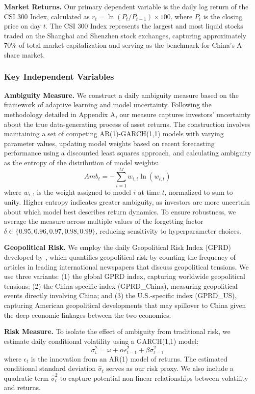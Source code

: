\documentclass[preprint,12pt,authoryear]{elsarticle}
\begin{document}
\textbf{Market Returns.} Our primary dependent variable is the daily log return of the CSI 300 Index, calculated as $r_t = \ln(P_t/P_{t-1}) \times 100$, where $P_t$ is the closing price on day $t$. The CSI 300 Index represents the largest and most liquid stocks traded on the Shanghai and Shenzhen stock exchanges, capturing approximately 70\% of total market capitalization and serving as the benchmark for China's A-share market.

\subsubsection{Key Independent Variables}

\textbf{Ambiguity Measure.} We construct a daily ambiguity measure based on the framework of adaptive learning and model uncertainty. Following the methodology detailed in Appendix A, our measure captures investors' uncertainty about the true data-generating process of asset returns. The construction involves maintaining a set of competing AR(1)-GARCH(1,1) models with varying parameter values, updating model weights based on recent forecasting performance using a discounted least squares approach, and calculating ambiguity as the entropy of the distribution of model weights:
\begin{equation}
Amb_t = -\sum_{i=1}^{M} w_{i,t} \ln(w_{i,t})
\end{equation}
where $w_{i,t}$ is the weight assigned to model $i$ at time $t$, normalized to sum to unity. Higher entropy indicates greater ambiguity, as investors are more uncertain about which model best describes return dynamics. To ensure robustness, we average the measure across multiple values of the forgetting factor $\delta \in \{0.95, 0.96, 0.97, 0.98, 0.99\}$, reducing sensitivity to hyperparameter choices.

\textbf{Geopolitical Risk.} We employ the daily Geopolitical Risk Index (GPRD) developed by \citet{caldara2022measuring}, which quantifies geopolitical risk by counting the frequency of articles in leading international newspapers that discuss geopolitical tensions. We use three variants: (1) the global GPRD index, capturing worldwide geopolitical tensions; (2) the China-specific index (GPRD\_China), measuring geopolitical events directly involving China; and (3) the U.S.-specific index (GPRD\_US), capturing American geopolitical developments that may spillover to China given the deep economic linkages between the two economies.

\textbf{Risk Measure.} To isolate the effect of ambiguity from traditional risk, we estimate daily conditional volatility using a GARCH(1,1) model:
\begin{equation}
\sigma_t^2 = \omega + \alpha \epsilon_{t-1}^2 + \beta \sigma_{t-1}^2
\end{equation}
where $\epsilon_t$ is the innovation from an AR(1) model of returns. The estimated conditional standard deviation $\hat{\sigma}_t$ serves as our risk proxy. We also include a quadratic term $\hat{\sigma}_t^2$ to capture potential non-linear relationships between volatility and returns.
\end{document}
